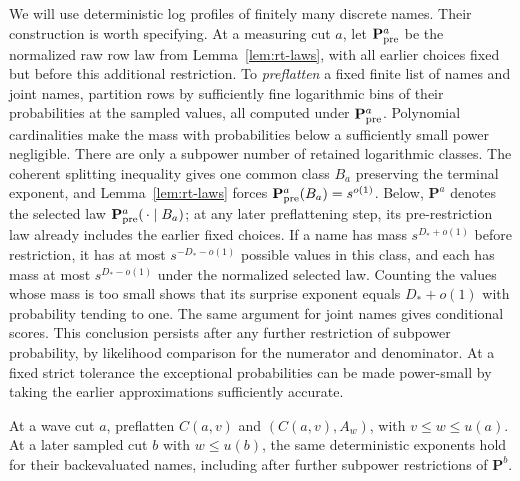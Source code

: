 We will use deterministic log profiles of finitely many discrete
names.  Their construction is worth specifying.  At a measuring cut
$a$, let $\mathbf P^a_{\rm pre}$ be the normalized raw row law from
Lemma~\ref{lem:rt-laws}, with all earlier choices fixed but before this
additional restriction.  To \emph{preflatten} a fixed finite list of
names and joint names, partition rows by sufficiently fine logarithmic
bins of their probabilities at the sampled values, all computed under
$\mathbf P^a_{\rm pre}$.  Polynomial cardinalities make the
mass with probabilities below a sufficiently small power negligible.
There are only a subpower number of retained logarithmic classes.
The coherent splitting inequality gives one common class $B_a$
preserving the terminal exponent, and Lemma~\ref{lem:rt-laws} forces
$\mathbf P^a_{\rm pre}(B_a)=s^{o(1)}$.  Below, $\mathbf P^a$ denotes
the selected law $\mathbf P^a_{\rm pre}(\,\cdot\mid B_a)$; at any later
preflattening step, its pre-restriction law already includes the earlier
fixed choices.  If a name has mass
$s^{D_*+o(1)}$ before restriction, it has at most
$s^{-D_*-o(1)}$ possible values in this class, and each has mass at
most $s^{D_*-o(1)}$ under the normalized selected law.  Counting
the values whose mass is too small shows that its surprise exponent
equals $D_*+o(1)$ with probability tending to one.  The same
argument for joint names gives conditional scores.  This conclusion
persists after any further restriction of subpower probability,
by likelihood comparison for the numerator and denominator.  At a
fixed strict tolerance the exceptional probabilities can be made
power-small by taking the earlier approximations sufficiently accurate.

\begin{lemma}\label{lem:rt-stability}
At a wave cut $a$, preflatten $C(a,v)$ and $(C(a,v),A_w)$, with
$v\le w\le u(a)$.  At a later sampled cut $b$ with
$w\le u(b)$, the same deterministic exponents hold for their
backevaluated names, including after further subpower restrictions
of $\mathbf P^b$.
\end{lemma}

